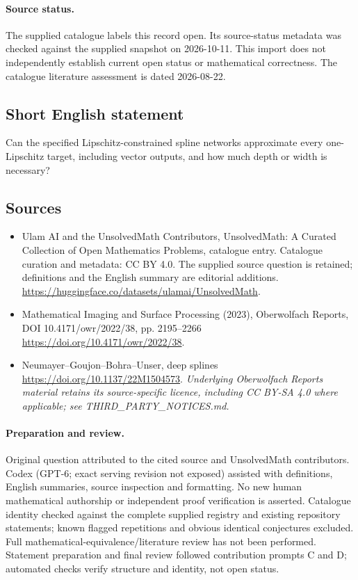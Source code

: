 \documentclass[11pt]{article}
\begin{document}
\paragraph{Source status.}
The supplied catalogue labels this record open. Its source-status metadata was checked against the supplied snapshot on 2026-10-11. This import does not independently establish current open status or mathematical correctness. The catalogue literature assessment is dated 2026-08-22.
\subsection{Short English statement}
Can the specified Lipschitz-constrained spline networks approximate every one-Lipschitz target, including vector outputs, and how much depth or width is necessary?
\subsection{Sources}
\begin{itemize}
\item[\hypertarget{source:statement:1}{S1}] Ulam AI and the UnsolvedMath Contributors, UnsolvedMath: A Curated Collection of Open Mathematics Problems, catalogue entry. Catalogue curation and metadata: CC BY 4.0. The supplied source question is retained; definitions and the English summary are editorial additions.
\url{https://huggingface.co/datasets/ulamai/UnsolvedMath}.
\item[\hypertarget{source:statement:2}{S2}] Mathematical Imaging and Surface Processing (2023), Oberwolfach Reports, DOI 10.4171/owr/2022/38, pp. 2195--2266
\url{https://doi.org/10.4171/owr/2022/38}.
\item[\hypertarget{source:statement:3}{S3}] Neumayer--Goujon--Bohra--Unser, deep splines
\url{https://doi.org/10.1137/22M1504573}.
\textit{Underlying Oberwolfach Reports material retains its source-specific licence, including CC BY-SA 4.0 where applicable; see THIRD\_PARTY\_NOTICES.md.}
\end{itemize}
\paragraph{Preparation and review.}
Original question attributed to the cited source and UnsolvedMath contributors. Codex (GPT-6; exact serving revision not exposed) assisted with definitions, English summaries, source inspection and formatting. No new human mathematical authorship or independent proof verification is asserted. Catalogue identity checked against the complete supplied registry and existing repository statements; known flagged repetitions and obvious identical conjectures excluded. Full mathematical-equivalence/literature review has not been performed. Statement preparation and final review followed contribution prompts C and D; automated checks verify structure and identity, not open status.
\label{end:statement}
\end{document}
